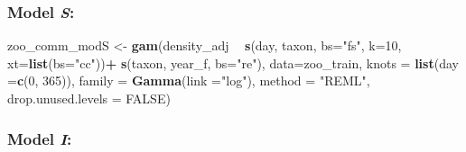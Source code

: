 \documentclass[12pt]{article}
\newenvironment{Shaded}{\begin{snugshade}}{\end{snugshade}}
\newcommand{\KeywordTok}[1]{\textcolor[rgb]{0.13,0.29,0.53}{\textbf{#1}}}
\newcommand{\DataTypeTok}[1]{\textcolor[rgb]{0.13,0.29,0.53}{#1}}
\newcommand{\DecValTok}[1]{\textcolor[rgb]{0.00,0.00,0.81}{#1}}
\newcommand{\StringTok}[1]{\textcolor[rgb]{0.31,0.60,0.02}{#1}}
\newcommand{\OtherTok}[1]{\textcolor[rgb]{0.56,0.35,0.01}{#1}}
\newcommand{\OperatorTok}[1]{\textcolor[rgb]{0.81,0.36,0.00}{\textbf{#1}}}
\newcommand{\NormalTok}[1]{#1}
\begin{document}
\subsubsection{\texorpdfstring{Model
\emph{S}:}{Model S:}}\label{model-s-1}

\begin{Shaded}
\begin{Highlighting}[]
\NormalTok{zoo_comm_modS <-}\StringTok{ }\KeywordTok{gam}\NormalTok{(density_adj }\OperatorTok{~}\StringTok{ }\KeywordTok{s}\NormalTok{(day, taxon,}
                                     \DataTypeTok{bs=}\StringTok{"fs"}\NormalTok{,}
                                     \DataTypeTok{k=}\DecValTok{10}\NormalTok{,}
                                     \DataTypeTok{xt=}\KeywordTok{list}\NormalTok{(}\DataTypeTok{bs=}\StringTok{"cc"}\NormalTok{))}\OperatorTok{+}
\StringTok{                                   }\KeywordTok{s}\NormalTok{(taxon, year_f, }\DataTypeTok{bs=}\StringTok{"re"}\NormalTok{),}
                     \DataTypeTok{data=}\NormalTok{zoo_train,}
                     \DataTypeTok{knots =} \KeywordTok{list}\NormalTok{(}\DataTypeTok{day =}\KeywordTok{c}\NormalTok{(}\DecValTok{0}\NormalTok{, }\DecValTok{365}\NormalTok{)),}
                     \DataTypeTok{family =} \KeywordTok{Gamma}\NormalTok{(}\DataTypeTok{link =}\StringTok{"log"}\NormalTok{), }
                     \DataTypeTok{method =} \StringTok{"REML"}\NormalTok{,}
                     \DataTypeTok{drop.unused.levels =} \OtherTok{FALSE}\NormalTok{)}
\end{Highlighting}
\end{Shaded}

\subsubsection{\texorpdfstring{Model
\emph{I}:}{Model I:}}\label{model-i-1}
\end{document}
